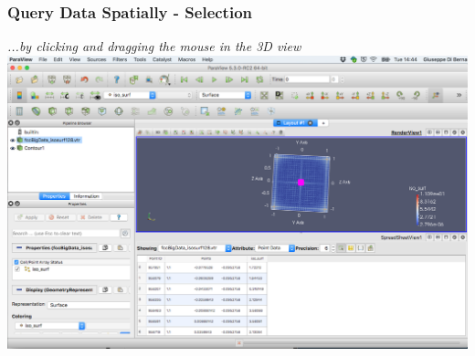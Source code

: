 \documentclass[]{beamer}
\begin{document}

\begin{frame}
\frametitle{Query Data Spatially - Selection}
    \textit{...by clicking and dragging the mouse in the 3D view}
     \includegraphics[width=.9\textwidth]{pics/visual_query}
\end{frame}

\end{document}
